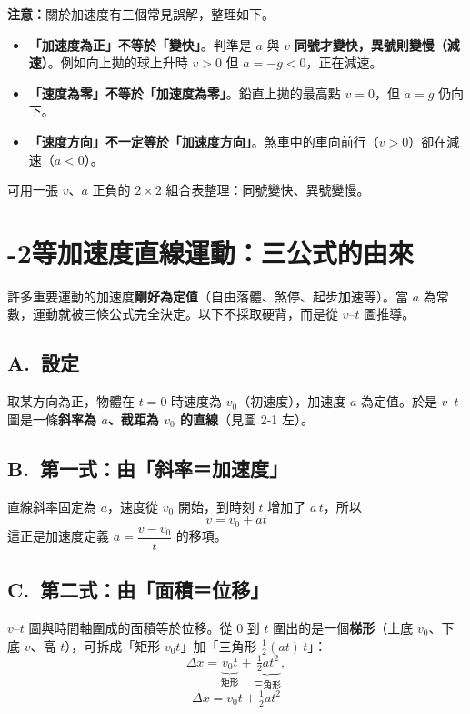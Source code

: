 \documentclass[11pt]{article}
\begin{document}
\textbf{注意：}關於加速度有三個常見誤解，整理如下。
\begin{itemize}\setlength{\itemsep}{1pt}
\item \textbf{「加速度為正」不等於「變快」}。判準是 $a$ 與 $v$ \textbf{同號才變快，異號則變慢（減速）}。例如向上拋的球上升時 $v>0$ 但 $a=-g<0$，正在減速。
\item \textbf{「速度為零」不等於「加速度為零」}。鉛直上拋的最高點 $v=0$，但 $a=g$ 仍向下。
\item \textbf{「速度方向」不一定等於「加速度方向」}。煞車中的車向前行（$v>0$）卻在減速（$a<0$）。
\end{itemize}
可用一張 $v$、$a$ 正負的 $2\times 2$ 組合表整理：同號變快、異號變慢。

\section*{-2\quad 等加速度直線運動：三公式的由來}

許多重要運動的加速度\textbf{剛好為定值}（自由落體、煞停、起步加速等）。當 $a$ 為常數，運動就被三條公式完全決定。以下不採取硬背，而是從 $v\text{–}t$ 圖推導。

\subsection*{\sffamily A.\ 設定}

取某方向為正，物體在 $t=0$ 時速度為 $v_0$（初速度），加速度 $a$ 為定值。於是 $v\text{–}t$ 圖是一條\textbf{斜率為 $a$、截距為 $v_0$ 的直線}（見圖 2-1 左）。

\subsection*{\sffamily B.\ 第一式：由「斜率＝加速度」}

直線斜率固定為 $a$，速度從 $v_0$ 開始，到時刻 $t$ 增加了 $a\,t$，所以
\begin{equation}\boxed{\,v = v_0 + a t\,}\tag{1}\end{equation}
這正是加速度定義 $a=\dfrac{v-v_0}{t}$ 的移項。

\subsection*{\sffamily C.\ 第二式：由「面積＝位移」}

$v\text{–}t$ 圖與時間軸圍成的面積等於位移。從 $0$ 到 $t$ 圍出的是一個\textbf{梯形}（上底 $v_0$、下底 $v$、高 $t$），可拆成「矩形 $v_0 t$」加「三角形 $\tfrac12(at)\,t$」：
$$\Delta x = \underbrace{v_0 t}_{\text{矩形}} + \underbrace{\tfrac12 a t^2}_{\text{三角形}},$$
\begin{equation}\boxed{\,\Delta x = v_0 t + \tfrac12 a t^2\,}\tag{2}\end{equation}
\end{document}
